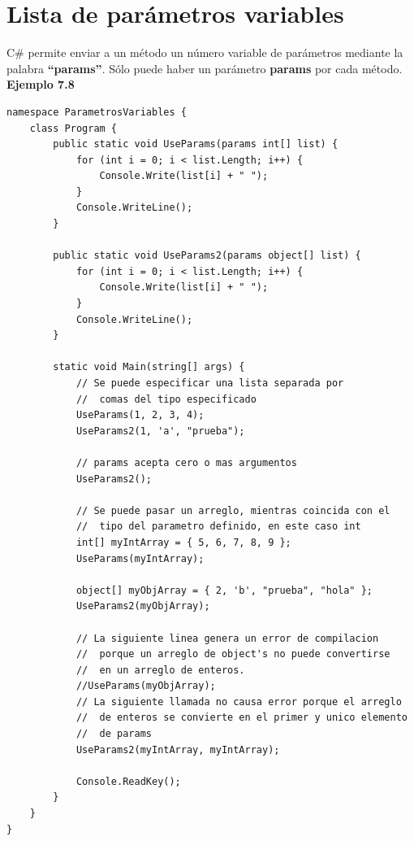 \documentclass[12pt,a4paper]{report}
\begin{document}
\section{Lista de parámetros variables}
C\# permite enviar a un método un número variable de parámetros mediante la palabra \textbf{``params”}. Sólo puede haber un parámetro\textbf{ params} por cada método.\\\textbf{Ejemplo 7.8}
\begin{lstlisting}
namespace ParametrosVariables {
	class Program {
		public static void UseParams(params int[] list) {
			for (int i = 0; i < list.Length; i++) {
				Console.Write(list[i] + " ");
			}
			Console.WriteLine();
		}

		public static void UseParams2(params object[] list) {
			for (int i = 0; i < list.Length; i++) {
				Console.Write(list[i] + " ");
			}
			Console.WriteLine();
		}

		static void Main(string[] args) {
			// Se puede especificar una lista separada por 
			//	comas del tipo especificado        
			UseParams(1, 2, 3, 4);
			UseParams2(1, 'a', "prueba");

			// params acepta cero o mas argumentos       
			UseParams2();

			// Se puede pasar un arreglo, mientras coincida con el
			//	tipo del parametro definido, en este caso int        
			int[] myIntArray = { 5, 6, 7, 8, 9 };
			UseParams(myIntArray);

			object[] myObjArray = { 2, 'b', "prueba", "hola" };
			UseParams2(myObjArray);

			// La siguiente linea genera un error de compilacion 
			//	porque un arreglo de object's no puede convertirse
			//	en un arreglo de enteros.
			//UseParams(myObjArray);
			// La siguiente llamada no causa error porque el arreglo
			//	de enteros se convierte en el primer y unico elemento
			//	de params            
			UseParams2(myIntArray, myIntArray);

			Console.ReadKey();
		}        
	}
}
\end{lstlisting}
\end{document}
